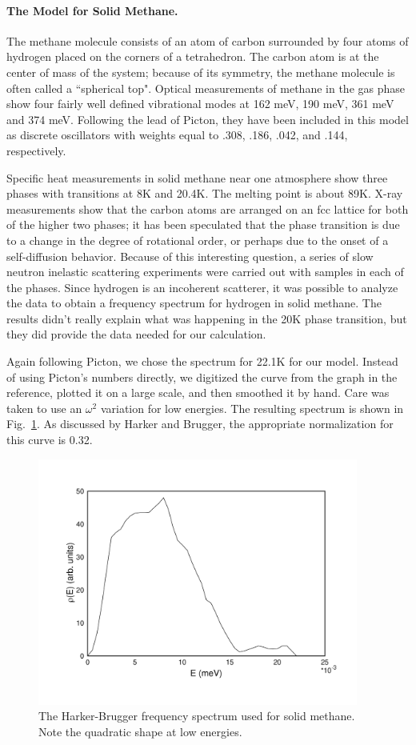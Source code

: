 \paragraph{The Model for Solid Methane.}
The methane molecule consists of an atom of carbon surrounded by four
atoms of hydrogen placed on the corners of a tetrahedron.  The carbon
atom is at the center of mass of the system; because of its symmetry,
the methane molecule is often called a ``spherical top".  Optical
measurements of methane in the gas phase show four fairly well defined
vibrational modes at 162 meV, 190 meV, 361 meV and 374 meV.  Following the lead
of Picton, they have been included in this model as discrete oscillators
with weights equal to .308, .186, .042, and .144, respectively.

Specific heat measurements in solid methane near one atmosphere show
three phases with transitions at 8K and 20.4K.  The melting point is
about 89K.  X-ray measurements show that the carbon atoms are
arranged on an fcc lattice for both of the higher two phases; it has
been speculated that the phase transition is due to a change in the
degree of rotational order, or perhaps due to the onset of a
self-diffusion behavior.  Because of this interesting question, a
series of slow neutron inelastic scattering experiments were carried
out with samples in each of the phases\cite{HB}.  Since hydrogen is
an incoherent scatterer, it was possible to analyze the data to obtain
a frequency spectrum for hydrogen in solid methane.  The results didn't
really explain what was happening in the 20K phase transition, but they
did provide the data needed for our calculation.

Again following Picton, we chose the spectrum for 22.1K for our model.
Instead of using Picton's numbers directly, we digitized the curve from
the graph in the reference, plotted it on a large scale, and then
smoothed it by hand.  Care was taken to use an $\omega^2$ variation
for low energies.  The resulting spectrum is shown in Fig.~\ref{smethr}.
As discussed by Harker and Brugger, the appropriate normalization for
this curve is 0.32.

\begin{figure}[t]\centering
\includegraphics[keepaspectratio, height=3.2in, angle=0]{figs/le1ack}
\caption[Harker-Brugger frequency spectrum used for solid methane]{The
 Harker-Brugger frequency spectrum used for solid methane.  Note the
 quadratic shape at low energies.}
\label{smethr}
\end{figure}

